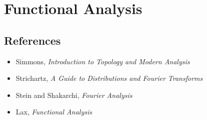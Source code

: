 \section{Functional Analysis}
\subsection*{References}
\begin{itemize}
    \item Simmons, \emph{Introduction to Topology and Modern Analysis}
    \item Strichartz, \emph{A Guide to Distributions and Fourier Transforms}
    \item Stein and Shakarchi, \emph{Fourier Analysis}
    \item Lax, \emph{Functional Analysis}
\end{itemize}
